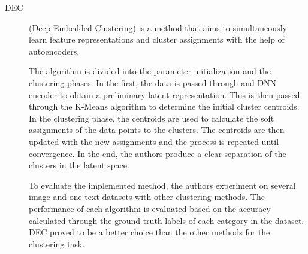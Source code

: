 \begin{description}
    \item[DEC]\cite{Xie.Girshick.ea_UnsupervisedDeepEmbedding_2016} (Deep Embedded Clustering) is a method that aims to simultaneously learn feature representations and cluster assignments with the help of autoencoders.
    
    The algorithm is divided into the parameter initialization and the clustering phases. In the first, the data is passed through and DNN encoder to obtain a preliminary latent representation. This is then passed through the K-Means algorithm to determine the initial cluster centroids. In the clustering phase, the centroids are used to calculate the soft assignments of the data points to the clusters. The centroids are then updated with the new assignments and the process is repeated until convergence. In the end, the authors produce a clear separation of the clusters in the latent space.

    To evaluate the implemented method, the authors experiment on several image and one text datasets with other clustering methods. The performance of each algorithm is evaluated based on the accuracy calculated through the ground truth labels of each category in the dataset. DEC proved to be a better choice than the other methods for the clustering task.
\end{description}

